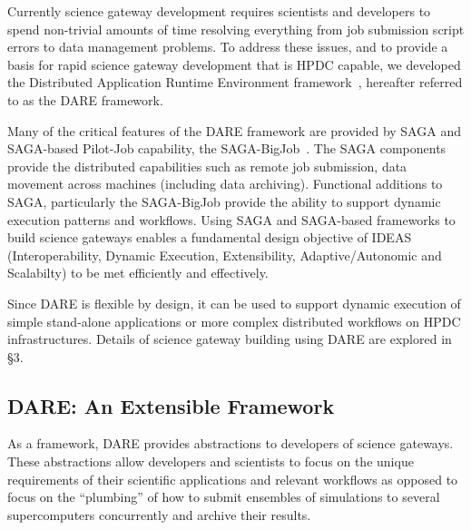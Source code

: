 \documentclass[]{svjour3}
\begin{document}
  Currently science gateway development requires scientists and
  developers to spend non-trivial amounts of time resolving everything
  from job submission script errors to data management problems. To
  address these issues, and to provide a basis for rapid science
  gateway development that is HPDC capable, we developed the
  Distributed Application Runtime Environment
  framework~\cite{dareurl}, hereafter referred to as the DARE
  framework.
  
  Many of the critical features of the DARE framework are provided by
  SAGA and SAGA-based Pilot-Job capability, the
  SAGA-BigJob~\cite{saga_bigjob_condor_cloud}.  The SAGA components
  provide the distributed capabilities such as remote job submission,
  data movement across machines (including data archiving).
  Functional additions to SAGA, particularly the SAGA-BigJob provide
  the ability to support dynamic execution patterns and
  workflows. Using SAGA and SAGA-based frameworks to build science
  gateways enables a fundamental design objective of
  IDEAS~\cite{ideas} (Interoperability, Dynamic Execution,
  Extensibility, Adaptive/Autonomic and Scalabilty) to be met
  efficiently and
  effectively.  %
 
  Since DARE is flexible by design, it can be used to support dynamic
  execution of simple stand-alone applications or more complex distributed
  workflows on HPDC infrastructures. Details of science gateway building
  using DARE are explored in \S3.


\subsection{DARE: An Extensible Framework}


As a framework, DARE provides abstractions to developers of science gateways. These
abstractions allow developers and scientists to focus on the unique requirements
of their scientific applications and relevant workflows as opposed to focus
on the ``plumbing'' of how to submit ensembles of simulations to several supercomputers
concurrently and archive their results.
\end{document}
